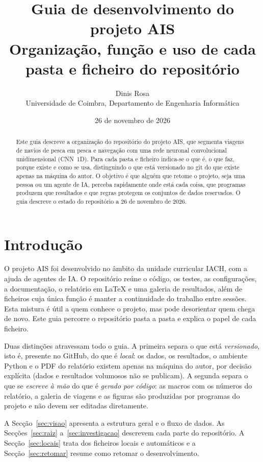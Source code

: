 \documentclass[11pt,a4paper]{article}
\title{\textbf{Guia de desenvolvimento do projeto AIS}\\[4pt]
\large Organização, função e uso de cada pasta e ficheiro do repositório}
\author{Dinis Rosa\\[2pt]\small Universidade de Coimbra, Departamento de Engenharia Informática}
\date{26 de novembro de 2026}
\begin{document}
\maketitle

\begin{abstract}
\noindent Este guia descreve a organização do repositório do projeto AIS, que segmenta viagens de
navios de pesca em pesca e navegação com uma rede neuronal convolucional unidimensional (CNN~1D).
Para cada pasta e ficheiro indica-se o que é, o que faz, porque existe e como se usa, distinguindo
o que está versionado no git do que existe apenas na máquina do autor. O objetivo é que alguém que
retome o projeto, seja uma pessoa ou um agente de IA, perceba rapidamente onde está cada coisa, que
programas produzem que resultados e que regras protegem os conjuntos de dados reservados. O guia
descreve o estado do repositório a 26 de novembro de 2026.
\end{abstract}

\tableofcontents
\bigskip

\section{Introdução}

O projeto AIS foi desenvolvido no âmbito da unidade curricular IACH, com a ajuda de agentes de IA.
O repositório reúne o código, os testes, as configurações, a documentação, o relatório em LaTeX e
uma galeria de resultados, além de ficheiros cuja única função é manter a continuidade do trabalho
entre sessões. Esta mistura é útil a quem conhece o projeto, mas pode desorientar quem chega de
novo. Este guia percorre o repositório pasta a pasta e explica o papel de cada ficheiro.

Duas distinções atravessam todo o guia. A primeira separa o que está \emph{versionado}, isto é,
presente no GitHub, do que é \emph{local}: os dados, os resultados, o ambiente Python e o PDF do
relatório existem apenas na máquina do autor, por decisão explícita (dados e resultados volumosos
não se publicam). A segunda separa o que se \emph{escreve à mão} do que é \emph{gerado por código}:
as macros com os números do relatório, a galeria de viagens e as figuras são produzidas por
programas do projeto e não devem ser editadas diretamente.

A Secção~\ref{sec:visao} apresenta a estrutura geral e o fluxo de dados. As
Secções~\ref{sec:raiz} a~\ref{sec:investigacao} descrevem cada parte do repositório. A
Secção~\ref{sec:locais} trata dos ficheiros locais e automáticos e a Secção~\ref{sec:retomar}
resume como retomar o desenvolvimento.
\end{document}
